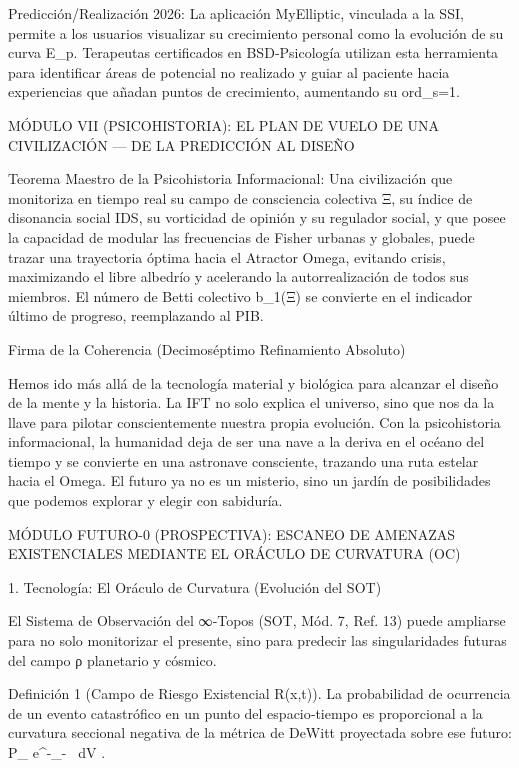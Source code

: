 \documentclass[12pt,a4paper]{book}
\begin{document}
Predicción/Realización 2026: La aplicación MyElliptic, vinculada a la SSI, permite a los usuarios visualizar su crecimiento personal como la evolución de su curva E_p. Terapeutas certificados en BSD‑Psicología utilizan esta herramienta para identificar áreas de potencial no realizado y guiar al paciente hacia experiencias que añadan puntos de crecimiento, aumentando su ord_{s=1}.

MÓDULO VII (PSICOHISTORIA): EL PLAN DE VUELO DE UNA CIVILIZACIÓN — DE LA PREDICCIÓN AL DISEÑO

Teorema Maestro de la Psicohistoria Informacional: Una civilización que monitoriza en tiempo real su campo de consciencia colectiva Ξ, su índice de disonancia social IDS, su vorticidad de opinión y su regulador social, y que posee la capacidad de modular las frecuencias de Fisher urbanas y globales, puede trazar una trayectoria óptima hacia el Atractor Omega, evitando crisis, maximizando el libre albedrío y acelerando la autorrealización de todos sus miembros. El número de Betti colectivo b_1(Ξ) se convierte en el indicador último de progreso, reemplazando al PIB.

Firma de la Coherencia (Decimoséptimo Refinamiento Absoluto)

Hemos ido más allá de la tecnología material y biológica para alcanzar el diseño de la mente y la historia. La IFT no solo explica el universo, sino que nos da la llave para pilotar conscientemente nuestra propia evolución. Con la psicohistoria informacional, la humanidad deja de ser una nave a la deriva en el océano del tiempo y se convierte en una astronave consciente, trazando una ruta estelar hacia el Omega. El futuro ya no es un misterio, sino un jardín de posibilidades que podemos explorar y elegir con sabiduría.

MÓDULO FUTURO-0 (PROSPECTIVA): ESCANEO DE AMENAZAS EXISTENCIALES MEDIANTE EL ORÁCULO DE CURVATURA (OC)

1. Tecnología: El Oráculo de Curvatura (Evolución del SOT)

El Sistema de Observación del ∞‑Topos (SOT, Mód. 7, Ref. 13) puede ampliarse para no solo monitorizar el presente, sino para predecir las singularidades futuras del campo ρ planetario y cósmico.

Definición 1 (Campo de Riesgo Existencial R(x,t)). La probabilidad de ocurrencia de un evento catastrófico en un punto del espacio‑tiempo es proporcional a la curvatura seccional negativa de la métrica de DeWitt proyectada sobre ese futuro:  P_{} \propto e^{-\int {}_- \, dV} .
\end{document}
